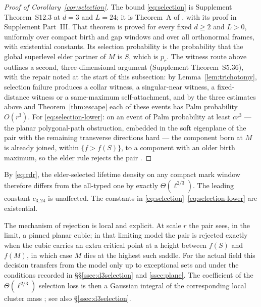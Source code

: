 \begin{proof}[Proof of Corollary~\ref{cor:selection}]
The bound \eqref{eq:selection} is Supplement Theorem~S12.3 at $d=3$ and $L=24$; it is Theorem~A of , with its proof in Supplement Part~III. That theorem is proved for every fixed $d\ge2$ and $L>0$, uniformly over compact birth and gap windows and over all orthonormal frames, with existential constants. Its selection probability is the probability that the global superlevel elder partner of $M$ is $S$, which is $p_r$. The witness route above outlines a second, three-dimensional argument (Supplement Theorem~S5.36), with the repair noted at the start of this subsection: by Lemma~\ref{lem:trichotomy}, selection failure produces a collar witness, a singular-near witness, a fixed-distance witness or a same-maximum self-attachment, and by the three estimates above and Theorem~\ref{thm:escape} each of these events has Palm probability $O(r^3)$. For \eqref{eq:selection-lower}: on an event of Palm probability at least $cr^3$ --- the planar polygonal-path obstruction, embedded in the soft eigenplane of the pair with the remaining transverse directions hard --- the component born at $M$ is already joined, within $\{f>f(S)\}$, to a component with an older birth maximum, so the elder rule rejects the pair .
\end{proof}

By \eqref{eq:rdr}, the elder-selected lifetime density on any compact mark window therefore differs from the all-typed one by exactly $\Theta(\ell^{2/3})$. The leading constant $c_{3,24}$ is unaffected. The constants in \eqref{eq:selection}--\eqref{eq:selection-lower} are existential.

\begin{remark}\label{rem:mechanism}
The mechanism of rejection is local and explicit. At scale $r$ the pair sees, in the limit, a pinned planar cubic; in that limiting model the pair is rejected exactly when the cubic carries an extra critical point at a height between $f(S)$ and $f(M)$, in which case $M$ dies at the highest such saddle. For the actual field this decision transfers from the model only up to exceptional sets and under the conditions recorded in \S\S\ref{ssec:d3selection} and \ref{ssec:plane}. The coefficient of the $\Theta(\ell^{2/3})$ selection loss is then a Gaussian integral of the corresponding local cluster mass ; see also \S\ref{ssec:d3selection}.
\end{remark}

